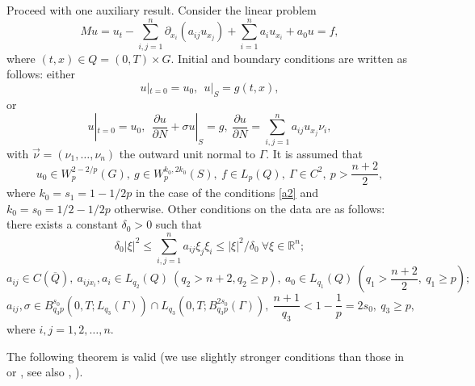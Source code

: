 \documentclass{article}
\theoremstyle{plain}
\begin{document}
Proceed with one auxiliary result. 
Consider the linear problem 
\begin{equation}\label{a1}
	Mu= u_t-\sum_{i,j=1}^n \partial_{x_i}(a_{ij}u_{x_j})+ \sum_{i=1}^n a_iu_{x_i}+ a_0u=f,
\end{equation}
where $(t,x)\in Q = (0,T) \times G$. Initial and boundary conditions are written as follows: 
either
\begin{equation}\label{a2}
	u|_{t=0}=u_0,\ \ u|_{S}= g(t,x), 
\end{equation}
or
\begin{equation}\label{a3}
	u|_{t=0}=u_0,\ \ \frac{\partial u}{\partial N}+\sigma u|_S=g, \ \frac{\partial u}{\partial N}= \sum_{i,j=1}^na_{ij}u_{x_j}\nu_i,
\end{equation}
with $\vec{\nu}=(\nu_1,\ldots,\nu_n)$ the outward unit normal to $\Gamma$. 
It is assumed that 
\begin{equation}\label{a4}
u_0\in W_p^{2-2/p}(G),\  g\in W_p^{k_0,2k_0}(S), \  f\in L_p(Q), \  \Gamma\in C^2,\ p>\frac{n+2}{2},
\end{equation}
where $k_0=s_1=1-1/2p$ in the case of the  conditions   \eqref{a2} and $k_0=s_0=1/2-1/2p$ otherwise.  Other conditions on the data are as follows: 
there exists a constant $\delta_0>0$ such that
\begin{equation}\label{a5}
\delta_0|\xi|^2\leq  \sum_{i,j=1}^n a_{ij}\xi_j\xi_i\leq |\xi|^2/\delta_0\  \forall \xi\in {\mathbb R}^n;
\end{equation}
\begin{equation}\label{a501}
a_{ij}\in C(\overline{Q}), \ a_{ijx_i}, a_i\in L_{q_2}(Q) \ (q_2>n+2, q_2\geq p),\ a_0\in L_{q_1}(Q) \ (q_1>\frac{n+2}{2},\ q_1\geq p);
\end{equation}
\begin{equation}\label{a502}
a_{ij},\sigma \in B_{q_3p}^{s_0}(0,T; L_{q_3}(\Gamma))\cap L_{q_3}(0,T; B_{q_3p}^{2s_0}(\Gamma)), \ \frac{n+1}{q_3}< 1-\frac{1}{p}=2s_0, \ q_3\geq p,
\end{equation}
where $i,j=1,2,\ldots,n$.

The following theorem is valid   (we use slightly stronger conditions than those in
 \cite[Theorem 3.4]{lind} or \cite[Theorem 5.3]{lind1}, see also  \cite{den},    \cite[Theorem 2.1]{pya11}). 
   
\end{document}
